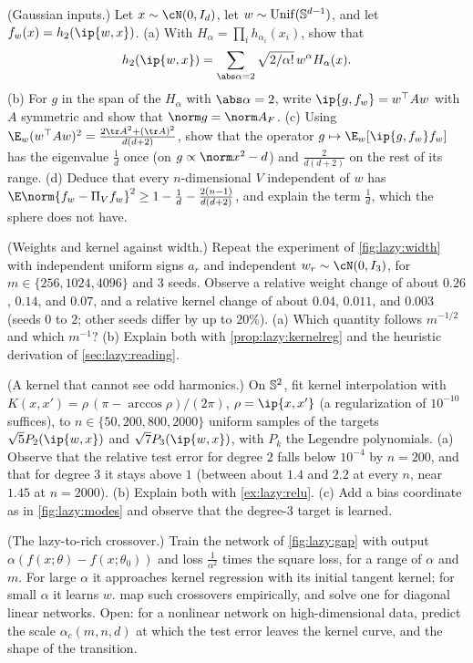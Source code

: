 \begin{refsection}
\begin{exercises}
\item \variation\hard (Gaussian inputs.) Let $x\sim\cN(0,I_d)$, let $w\sim\operatorname{Unif}(\mathbb{S}^{d-1})$, and let $f_w(x)=h_2(\ip{w,x})$. (a) With $H_\alpha=\prod_ih_{\alpha_i}(x_i)$, show that
\[
  h_2(\ip{w,x})=\sum_{\abs\alpha=2}\sqrt{2/\alpha!}\,w^\alpha H_\alpha(x).
\] (b) For $g$ in the span of the $H_\alpha$ with $\abs\alpha=2$, write $\ip{g,f_w}=w^\top Aw$ with $A$ symmetric and show that $\norm g=\norm A_F$. (c) Using $\E_w(w^\top Aw)^2=\frac{2\tr A^2+(\tr A)^2}{d(d+2)}$, show that the operator $g\mapsto\E_w[\ip{g,f_w}f_w]$ has the eigenvalue $\frac1d$ once (on $g\propto\norm x^2-d$) and $\frac2{d(d+2)}$ on the rest of its range. (d) Deduce that every $n$-dimensional $V$ independent of $w$ has $\E\norm{f_w-\Pi_Vf_w}^2\ge1-\frac1d-\frac{2(n-1)}{d(d+2)}$, and explain the term $\frac1d$, which the sphere does not have. \label{ex:lazy:gauss}

\item \simulation (Weights and kernel against width.) Repeat the experiment of \cref{fig:lazy:width} with independent uniform signs $a_r$ and independent $w_r\sim\cN(0,I_3)$, for $m\in\{256,1024,4096\}$ and $3$ seeds. Observe a relative weight change of about $0.26$, $0.14$, and $0.07$, and a relative kernel change of about $0.04$, $0.011$, and $0.003$ (seeds $0$ to $2$; other seeds differ by up to $20\%$). (a) Which quantity follows $m^{-1/2}$ and which $m^{-1}$? (b) Explain both with \cref{prop:lazy:kernelreg} and the heuristic derivation of \cref{sec:lazy:reading}.\label{ex:lazy:simwidth}

\item \simulation (A kernel that cannot see odd harmonics.) On $\mathbb{S}^2$, fit kernel interpolation with $K(x,x')=\rho\,(\pi-\arccos\rho)/(2\pi)$, $\rho=\ip{x,x'}$ (a regularization of $10^{-10}$ suffices), to $n\in\{50,200,800,2000\}$ uniform samples of the targets $\sqrt5P_2(\ip{w,x})$ and $\sqrt7P_3(\ip{w,x})$, with $P_k$ the Legendre polynomials. (a) Observe that the relative test error for degree $2$ falls below $10^{-4}$ by $n=200$, and that for degree $3$ it stays above $1$ (between about $1.4$ and $2.2$ at every $n$, near $1.45$ at $n=2000$). (b) Explain both with \cref{ex:lazy:relu}. (c) Add a bias coordinate as in \cref{fig:lazy:modes} and observe that the degree-$3$ target is learned.\label{ex:lazy:simodd}

\item \research (The lazy-to-rich crossover.) Train the network of \cref{fig:lazy:gap} with output $\alpha(f(x;\theta)-f(x;\theta_0))$ and loss $\frac1{\alpha^2}$ times the square loss, for a range of $\alpha$ and $m$. For large $\alpha$ it approaches kernel regression with its initial tangent kernel; for small $\alpha$ it learns $w$. \Textcite{GeigerEtAl2020} map such crossovers empirically, and \textcite{WoodworthEtAl2020} solve one for diagonal linear networks. Open: for a nonlinear network on high-dimensional data, predict the scale $\alpha_c(m,n,d)$ at which the test error leaves the kernel curve, and the shape of the transition.\label{ex:lazy:crossover}


\end{exercises}
\end{refsection}
